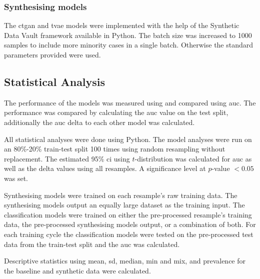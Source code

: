\documentclass[12pt, letterpaper]{article}
\begin{document}
\subsubsection*{Synthesising models}
The \acrfull{ctgan} \cite{xu_modeling_2019} and \acrfull{tvae} \cite{ishfaq_tvae_2018} models were implemented with the help of the Synthetic Data Vault framework \cite{patki_sdv_2016} available in Python. The batch size was increased to 1000 samples to include more minority cases in a single batch. Otherwise the standard parameters provided were used.

\subsection{Statistical Analysis}

The performance of the models was measured using and compared using \acrfull{auc}. The performance was compared by calculating the \acrshort{auc} value on the test split, additionally the \acrshort{auc} delta to each other model was calculated.

All statistical analyses were done using Python. The model analyses were run on an 80\%-20\% train-test split 100 times using random resampling without replacement. The estimated 95\% \acrfull{ci} using $t$-distribution was calculated for \acrshort{auc} as well as the delta values using all resamples. A significance level at $p$-value $< 0.05$ was set.

Synthesising models were trained on each resample's raw training data. The synthesising models output an equally large dataset as the training input. The classification models were trained on either the pre-processed resample's training data, the pre-processed synthesising models output, or a combination of both. For each training cycle the classification models were tested on the pre-processed test data from the train-test split and the \acrshort{auc} was calculated.

Descriptive statistics using mean, \acrfull{sd}, median, min and mix, and prevalence for the baseline and synthetic data were calculated.
\end{document}

